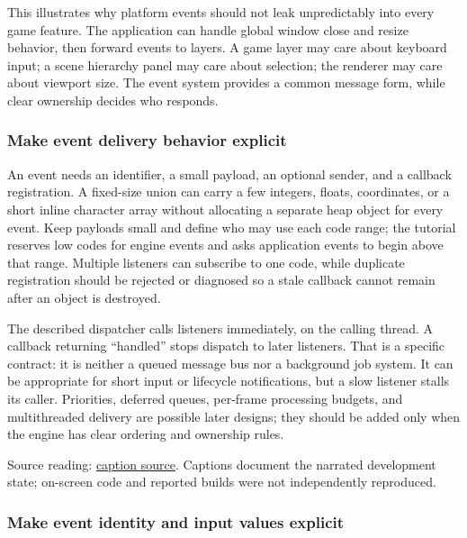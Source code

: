 This illustrates why platform events should not leak unpredictably into every game feature. The application can handle global window close and resize behavior, then forward events to layers. A game layer may care about keyboard input; a scene hierarchy panel may care about selection; the renderer may care about viewport size. The event system provides a common message form, while clear ownership decides who responds.

\subsubsection{Make event delivery behavior explicit}\label{05-engine-i-ch013-make-event-delivery-behavior-explicit}

\hypertarget{05-engine-i-ch013-make-event-delivery-behavior-explicit}{}

An event needs an identifier, a small payload, an optional sender, and a callback registration. A fixed-size union can carry a few integers, floats, coordinates, or a short inline character array without allocating a separate heap object for every event. Keep payloads small and define who may use each code range; the tutorial reserves low codes for engine events and asks application events to begin above that range. Multiple listeners can subscribe to one code, while duplicate registration should be rejected or diagnosed so a stale callback cannot remain after an object is destroyed.

The described dispatcher calls listeners immediately, on the calling thread. A callback returning ``handled'' stops dispatch to later listeners. That is a specific contract: it is neither a queued message bus nor a background job system. It can be appropriate for short input or lifecycle notifications, but a slow listener stalls its caller. Priorities, deferred queues, per-frame processing budgets, and multithreaded delivery are possible later designs; they should be added only when the engine has clear ordering and ownership rules.

Source reading: \href{https://www.youtube.com/watch?v=XQ6qljkh2KI}{caption source}. Captions document the narrated development state; on-screen code and reported builds were not independently reproduced.

\subsubsection{Make event identity and input values explicit}\label{05-engine-i-ch013-make-event-identity-and-input-values-explicit}

